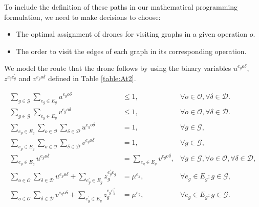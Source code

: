 


\noindent
To include the definition of these paths in our mathematical programming formulation, we need to make decisions to choose:
\begin{itemize}
    \item The optimal assignment of drones for visiting graphs in a given operation $o$.
    \item The order to visit the edges of each graph in its corresponding operation.
\end{itemize}

\noindent
We model the route that the drone follows by using the binary variables $u^{e_go\delta}$, $z^{e_ge^\prime_g}$ and $v^{e_go\delta}$ defined in Table \ref{table:At2}.

\begin{align}
    \sum_{g\in \mathcal G}\sum_{e_g\in E_g}  u^{e_go\delta} & \leq 1, &\forall o\in \mathcal O, \forall \delta\in\mathcal D.\label{st:NODEnt}\\
    \sum_{g\in \mathcal G}\sum_{e_g\in E_g}  v^{e_go\delta} & \leq 1, &\forall o\in \mathcal O, \forall \delta\in\mathcal D.\label{st:NODExt} \\
    \sum_{e_g\in E_g} \sum_{o\in \mathcal O} \sum_{\delta\in\mathcal D} u^{e_go\delta} & = 1, &\forall g\in\mathcal G, \label{st:NODEng}\\%
    \sum_{e_g\in E_g} \sum_{o\in \mathcal O} \sum_{\delta\in\mathcal D} v^{e_go\delta} & = 1, &\forall g\in\mathcal G, \label{st:NODExg}\\%
    \sum_{e_g\in E_g} u^{e_go\delta} & = \sum_{e_g\in E_g} v^{e_go\delta}, &\forall g\in\mathcal G, \forall o\in \mathcal O, \forall \delta\in\mathcal D, \label{st:NODuv}\\%
     \sum_{o\in \mathcal O} \sum_{\delta \in \mathcal D} u^{e_go\delta} + \sum_{e^\prime_g\in E_g} z_g^{e^\prime_ge_g} & = \mu^{e_g}, &\forall e_g\in E_g:g\in\mathcal G, \label{st:NODInu}\\
     \sum_{o\in \mathcal O} \sum_{\delta \in \mathcal D} v^{e_go\delta} + \sum_{e^\prime_g\in E_g} z_g^{e_ge^\prime_g} & = \mu^{e_g}, &\forall e_g\in E_g:g\in\mathcal G. \label{st:NODInv}
\end{align}

